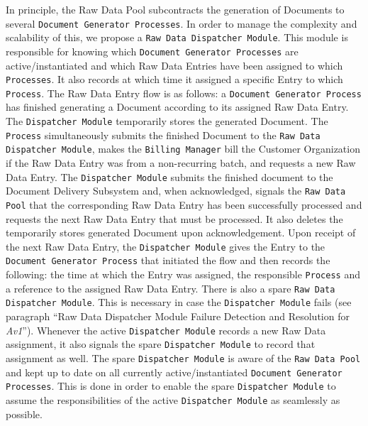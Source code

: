 \documentclass[a4paper,10pt]{article}
\begin{document}
In principle, the Raw Data Pool subcontracts the generation of Documents to several \texttt{Document Generator Processes}. In order to manage the complexity and scalability of this, we propose a \texttt{Raw Data Dispatcher Module}. This module is responsible for knowing which \texttt{Document Generator Processes} are active/instantiated and which Raw Data Entries have been assigned to which \texttt{Processes}. It also records at which time it assigned a specific Entry to which \texttt{Process}. The Raw Data Entry flow is as follows: a \texttt{Document Generator Process} has finished generating a Document according to its assigned Raw Data Entry. The \texttt{Dispatcher Module} temporarily stores the generated Document. The \texttt{Process} simultaneously submits the finished Document to the \texttt{Raw Data Dispatcher Module}, makes the \texttt{Billing Manager} bill the Customer Organization if the Raw Data Entry was from a non-recurring batch, and requests a new Raw Data Entry. The \texttt{Dispatcher Module} submits the finished document to the Document Delivery Subsystem and, when acknowledged, signals the \texttt{Raw Data Pool} that the corresponding Raw Data Entry has been successfully processed and requests the next Raw Data Entry that must be processed. It also deletes the temporarily stores generated Document upon acknowledgement. Upon receipt of the next Raw Data Entry, the \texttt{Dispatcher Module} gives the Entry to the \texttt{Document Generator Process} that initiated the flow and then records the following: the time at which the Entry was assigned, the responsible \texttt{Process} and a reference to the assigned Raw Data Entry. There is also a spare \texttt{Raw Data Dispatcher Module}. This is necessary in case the \texttt{Dispatcher Module} fails (see paragraph ``Raw Data Dispatcher Module Failure Detection and Resolution for \emph{Av1}''). Whenever the active \texttt{Dispatcher Module} records a new Raw Data assignment, it also signals the spare \texttt{Dispatcher Module} to record that assignment as well. The spare \texttt{Dispatcher Module} is aware of the \texttt{Raw Data Pool} and kept up to date on all currently active/instantiated \texttt{Document Generator Processes}. This is done in order to enable the spare \texttt{Dispatcher Module} to assume the responsibilities of the active \texttt{Dispatcher Module} as seamlessly as possible.
\end{document}
